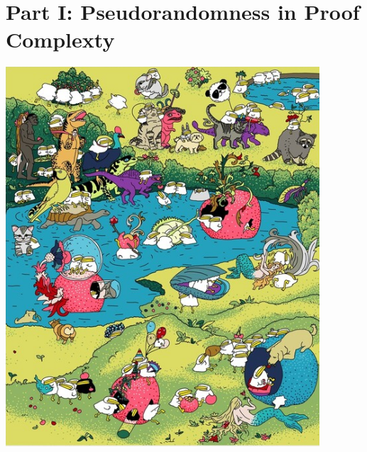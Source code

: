 \section{Part I: Pseudorandomness in Proof Complexty}

\begin{frame}
    \centering
    \insertsectionhead

    \vspace{0.3cm}
    \includegraphics[scale = 0.3]{pics/utia-garden.png}
\end{frame}

